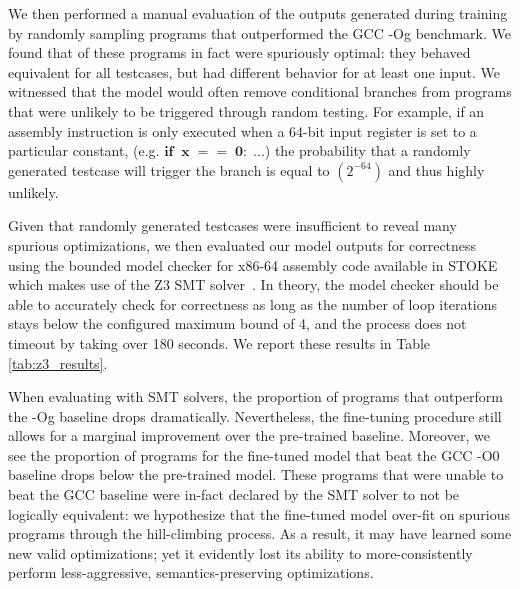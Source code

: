 \documentclass{article}
\begin{document}
We then performed a manual evaluation of the outputs generated during training by randomly sampling  programs that outperformed the GCC -Og benchmark. We found that  of these programs in fact were spuriously optimal: they behaved equivalent for all testcases, but had different behavior for at least one input. We witnessed that the model would often remove conditional branches from programs that were unlikely to be triggered through random testing.
%
For example, if an assembly instruction is only executed when a 64-bit input register is set to a particular constant,  
(e.g. $\textbf{if} \;\; \mathbf{x\;==\;0:\; ...}$)
the probability that a randomly generated testcase will trigger the branch is equal to $(2^{-64})$ and thus highly unlikely. 

Given that randomly generated testcases were insufficient to reveal many spurious optimizations, we then evaluated our model outputs for correctness using the  bounded model checker for x86-64 assembly code available in \textsc{STOKE} which makes use of the Z3 SMT solver~\cite{de2008z3}. 
In theory, the model checker should be able to accurately check for correctness as long as the number of loop iterations stays below the configured maximum bound of 4, and the process does not timeout by taking over 180 seconds.
We report these results in Table \ref{tab:z3_results}. 


When evaluating with SMT solvers, the proportion of programs that outperform the -Og baseline drops dramatically. Nevertheless, the fine-tuning procedure still allows for a marginal improvement over the pre-trained baseline. Moreover, we see the proportion of programs for the fine-tuned model that beat the GCC -O0 baseline drops below the pre-trained model. These programs that were unable to beat the GCC baseline were in-fact declared by the SMT solver to not be logically equivalent: we hypothesize that the fine-tuned model over-fit on spurious programs through the hill-climbing process. As a result, it may have learned some new valid optimizations; yet it evidently lost its ability to more-consistently perform less-aggressive, semantics-preserving optimizations. 
\end{document}
